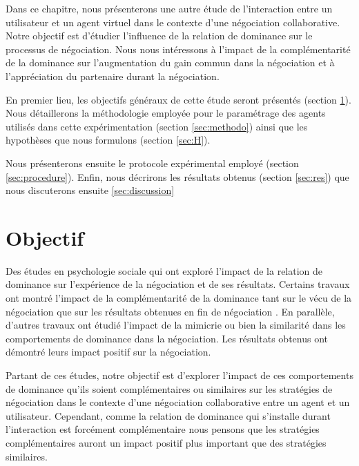 Dans ce chapitre, nous présenterons une autre étude de l'interaction entre un utilisateur et un agent virtuel dans le contexte d'une négociation collaborative. 
Notre objectif est d'étudier l'influence de la relation de dominance sur le processus de négociation. Nous nous intéressons à l'impact de la complémentarité de la dominance sur l'augmentation du gain commun dans la négociation et à l'appréciation du partenaire durant la négociation.

En premier lieu, les objectifs généraux de cette étude seront présentés (section \ref{sec:obj}). Nous détaillerons la méthodologie employée pour le paramétrage des agents utilisés dans cette expérimentation (section \ref{sec:methodo}) ainsi que les hypothèses que nous formulons (section \ref{sec:H}).

Nous présenterons ensuite le protocole expérimental employé (section \ref{sec:procedure}). Enfin, nous décrirons les résultats obtenus  (section \ref{sec:res})
que nous discuterons ensuite \ref{sec:discussion}
\section{Objectif}
\label{sec:obj}

Des études en psychologie sociale qui ont exploré l'impact de la relation de dominance sur l'expérience de la négociation et de ses résultats. Certains travaux ont montré l'impact de la complémentarité de la dominance tant sur le vécu de la négociation que sur les résultats obtenues en fin de négociation \cite{tiedens2003power,wiltermuth2009benefits,olekalns2013dyadic}.
En parallèle, d'autres travaux ont étudié l'impact de la mimicrie ou bien la similarité dans les comportements de dominance dans la négociation. Les résultats obtenus ont démontré leurs impact positif sur la négociation.

Partant de ces études, notre objectif est d'explorer l'impact de ces comportements de dominance qu'ils soient complémentaires ou similaires sur les stratégies de négociation dans le contexte d'une négociation collaborative entre un agent et un utilisateur. Cependant, comme la relation de dominance qui s'installe durant l'interaction est forcément complémentaire nous pensons que les stratégies complémentaires auront un impact positif plus important que des stratégies similaires.


